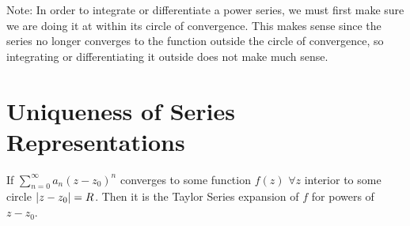 \documentclass[12pt, english]{book}
\begin{document}
	Note: In order to integrate or differentiate a power series, we must first make sure we are doing it at within its circle of convergence. This makes sense since the series no longer converges to the function outside the circle of convergence, so integrating or differentiating it outside does not make much sense.
	
	\section{Uniqueness of Series Representations} \label{Uniqueness of Series Representations Section - Complex}
	
	\begin{theorem}
		\label{Uniqueness of Taylor Series Theorem - Complex}
		If 
		\( \sum_{n=0}^{\infty} a_n (z-z_0)^n \) converges to some function \(f(z)\) \(\forall z\) interior to some circle \(\abs{z-z_0} = R\).
		Then it is the Taylor Series expansion of \(f\) for powers of \(z-z_0\).
	\end{theorem}
\end{document}
